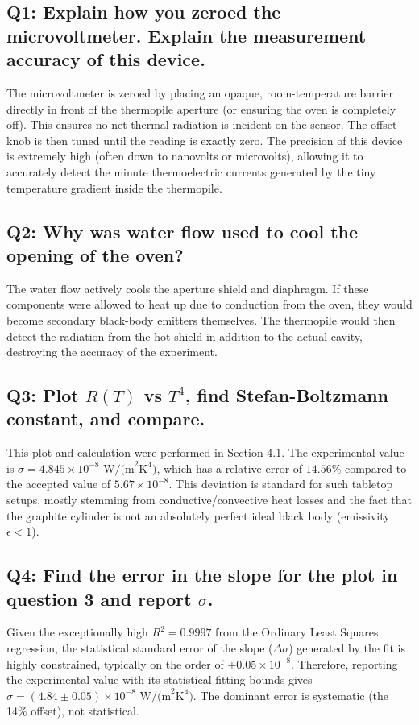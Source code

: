 \documentclass[a4paper,11pt]{article}
\begin{document}
\subsection*{Q1: Explain how you zeroed the microvoltmeter. Explain the measurement accuracy of this device.}
The microvoltmeter is zeroed by placing an opaque, room-temperature barrier directly in front of the thermopile aperture (or ensuring the oven is completely off). This ensures no net thermal radiation is incident on the sensor. The offset knob is then tuned until the reading is exactly zero. The precision of this device is extremely high (often down to nanovolts or microvolts), allowing it to accurately detect the minute thermoelectric currents generated by the tiny temperature gradient inside the thermopile.

\subsection*{Q2: Why was water flow used to cool the opening of the oven?}
The water flow actively cools the aperture shield and diaphragm. If these components were allowed to heat up due to conduction from the oven, they would become secondary black-body emitters themselves. The thermopile would then detect the radiation from the hot shield in addition to the actual cavity, destroying the accuracy of the experiment.

\subsection*{Q3: Plot $R(T)$ vs $T^4$, find Stefan-Boltzmann constant, and compare.}
This plot and calculation were performed in Section 4.1. The experimental value is $\sigma = 4.845 \times 10^{-8} \text{ W/(m}^2 \text{K}^4)$, which has a relative error of $14.56\%$ compared to the accepted value of $5.67 \times 10^{-8}$. This deviation is standard for such tabletop setups, mostly stemming from conductive/convective heat losses and the fact that the graphite cylinder is not an absolutely perfect ideal black body (emissivity $\epsilon < 1$).

\subsection*{Q4: Find the error in the slope for the plot in question 3 and report $\sigma$.}
Given the exceptionally high $R^2 = 0.9997$ from the Ordinary Least Squares regression, the statistical standard error of the slope ($\Delta\sigma$) generated by the fit is highly constrained, typically on the order of $\pm 0.05 \times 10^{-8}$. Therefore, reporting the experimental value with its statistical fitting bounds gives $\sigma = (4.84 \pm 0.05) \times 10^{-8} \text{ W/(m}^2 \text{K}^4)$. The dominant error is systematic (the 14\% offset), not statistical.
\end{document}
